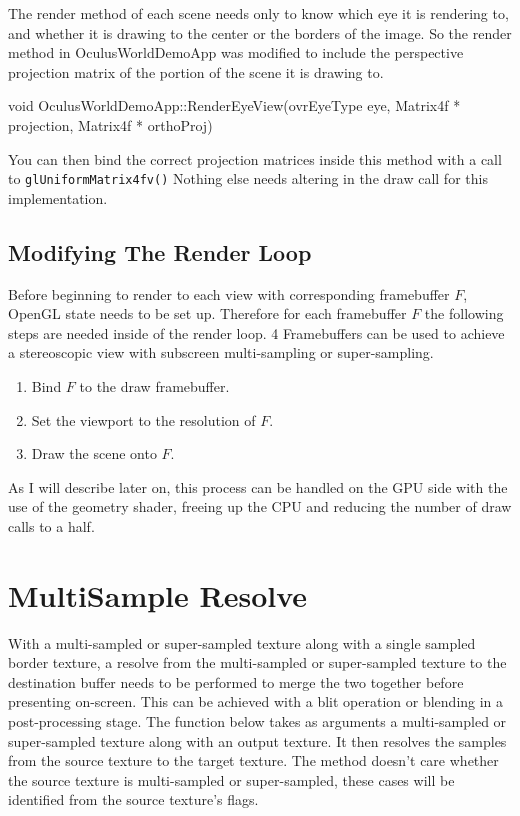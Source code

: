 \documentclass[12pt,a4paper,twoside,openright]{report}
\begin{document}
The render method of each scene needs only to know which eye it is rendering to, and whether it is drawing to the center or the borders of the image. 
So the render method in OculusWorldDemoApp was modified to include the perspective projection matrix of the portion of the scene it is drawing to.

\begin{blockcode}[commandchars=\\\{\}]
void OculusWorldDemoApp::RenderEyeView(ovrEyeType eye,
                                       \color{green}Matrix4f * projection,
                                       \color{green}Matrix4f * orthoProj)
\end{blockcode}

You can then bind the correct projection matrices inside this method with a call to \texttt{glUniformMatrix4fv()}
Nothing else needs altering in the draw call for this implementation.

\subsection{Modifying The Render Loop}

Before beginning to render to each view with corresponding framebuffer $F$, OpenGL state needs to be set up. Therefore for each framebuffer $F$ the following steps are needed inside of the render loop. 4 Framebuffers can be used to achieve a stereoscopic view with subscreen multi-sampling or super-sampling.

\begin{enumerate}

\item Bind $F$ to the draw framebuffer.
\item Set the viewport to the resolution of $F$.
\item Draw the scene onto $F$.

\end{enumerate}

As I will describe later on, this process can be handled on the GPU side with the use of the geometry shader, freeing up the CPU and reducing the number of draw calls to a half.

\section{MultiSample Resolve}\label{resolving}

With a multi-sampled or super-sampled texture along with a single sampled border texture, a resolve from the multi-sampled or super-sampled texture to the destination buffer needs to be performed to merge the two together before presenting on-screen. This can be achieved with a blit operation or blending in a post-processing stage.
The function below takes as arguments a multi-sampled or super-sampled texture along with an output texture. It then resolves the samples from the source texture to the target texture. The method doesn't care whether the source texture is multi-sampled or super-sampled, these cases will be identified from the source texture's flags.
\end{document}
